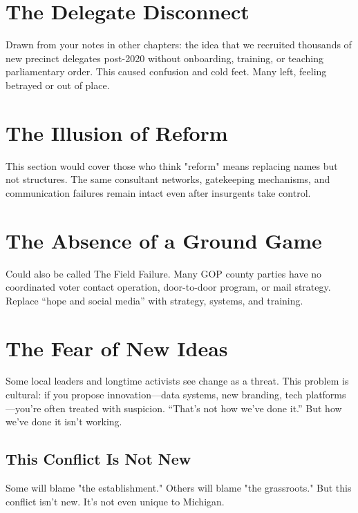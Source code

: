 






















\section{The Delegate Disconnect}
Drawn from your notes in other chapters: the idea that we recruited thousands of new precinct delegates post-2020 without onboarding, training, or teaching parliamentary order. This caused confusion and cold feet. Many left, feeling betrayed or out of place.
\section{The Illusion of Reform}
This section would cover those who think "reform" means replacing names but not structures. The same consultant networks, gatekeeping mechanisms, and communication failures remain intact even after insurgents take control.
\section{The Absence of a Ground Game}
Could also be called The Field Failure. Many GOP county parties have no coordinated voter contact operation, door-to-door program, or mail strategy. Replace “hope and social media” with strategy, systems, and training.
\section{The Fear of New Ideas}
Some local leaders and longtime activists see change as a threat. This problem is cultural: if you propose innovation—data systems, new branding, tech platforms—you’re often treated with suspicion. “That’s not how we’ve done it.” But how we’ve done it isn’t working.



\subsection{This Conflict Is Not New}

Some will blame "the establishment." Others will blame "the grassroots." But this conflict isn’t new. It’s not even unique to Michigan.

